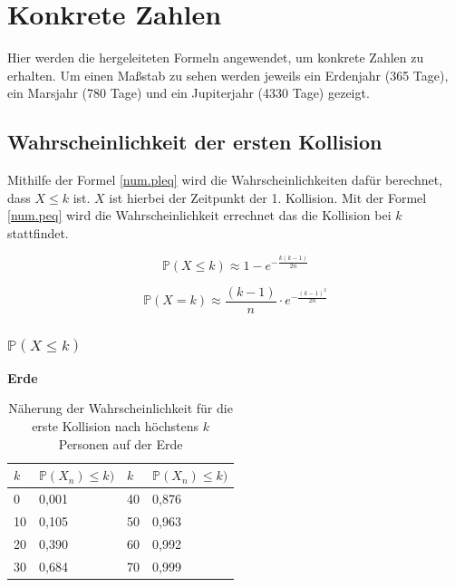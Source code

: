 \documentclass[../main.tex]{subfiles}
\begin{document}
    \section{Konkrete Zahlen}
    Hier werden die hergeleiteten Formeln angewendet, um konkrete Zahlen zu erhalten.
    Um einen Maßstab zu sehen werden jeweils ein Erdenjahr (365 Tage), ein Marsjahr (780 Tage) und ein Jupiterjahr (4330 Tage) gezeigt.

    \subsection{Wahrscheinlichkeit der ersten Kollision}

    Mithilfe der Formel \ref{num.pleq} wird die Wahrscheinlichkeiten dafür berechnet, dass $X \leq k$ ist. $X$ ist hierbei der
    Zeitpunkt der 1. Kollision.
    Mit der Formel \ref{num.peq} wird die Wahrscheinlichkeit errechnet das die Kollision bei $k$ stattfindet.

    \begin{equation}
        \mathbb{P}(X \leq k) \approx 1 - e^{- \frac{k(k-1)}{2n}}
        \label{num.pleq}
    \end{equation}

    \begin{equation}
        \mathbb{P}(X = k) \approx \frac{(k-1)}{n} \cdot e^{- \frac{(k-1)^2}{2n}}
        \label{num.peq}
    \end{equation}

    \subsubsection{$\mathbb{P}(X \leq k)$}

    \textbf{Erde}

    \begin{table}[h]
        \centering
        \begin{tabular}{|l|l|l|l|}
            \hline
            $k$ & $\mathbb{P}(X_{n}) \leq k)$ & $k$ & $\mathbb{P}(X_{n}) \leq k)$ \\ \hline
            0   & 0,001                       & 40  & 0,876                       \\
            10  & 0,105                       & 50  & 0,963                       \\
            20  & 0,390                       & 60  & 0,992                       \\
            30  & 0,684                       & 70  & 0,999                       \\ \hline
        \end{tabular}
        \caption{\label{num.tpe} Näherung der Wahrscheinlichkeit für die erste Kollision nach höchstens $k$ Personen auf der Erde}
    \end{table}
\end{document}
